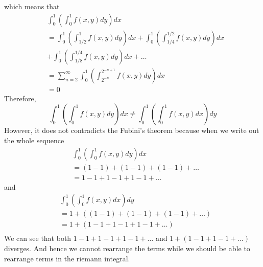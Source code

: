 \documentclass[11pt]{article}
\begin{document}
which means that 
\begin{equation*}
    \begin{align}
        &\int_0^1 \left(\int_0^1 f(x,y) dy \right) dx \\
        &= \int_0^1 \left(\int_{1/2}^1 f(x,y) dy \right) dx + \int_0^1 \left(\int_{1/4}^{1/2} f(x,y) dy \right) dx \\
        &+ \int_0^1 \left(\int_{1/8}^{1/4} f(x,y) dy \right) dx + \ldots \\
        &= \sum_{n=2}^\infty \int_0^1 \left(\int_{2^{-n}}^{2^{-n+1}} f(x,y) dy \right) dx \\
        &= 0 
    \end{align}
\end{equation*}
Therefore, 
\[
    \int_0^1 \left( \int_0^1 f(x,y) dy \right) dx \ne \int_0^1 \left( \int_0^1 f(x,y) dx \right) dy 
\]
However, it does not contradicts the Fubini's theorem because when we write out the whole sequence
\begin{equation*}
    \begin{align}
        &\int_0^1 \left( \int_0^1 f(x,y) dy \right) dx \\
        &= (1-1) + (1-1) + (1-1) + \ldots \\
        &= 1 - 1 + 1 - 1 + 1 -1 + \ldots 
    \end{align}
\end{equation*}
and 
\begin{equation*}
    \begin{align}
        &\int_0^1 \left( \int_0^1 f(x,y) dx \right) dy \\
        &= 1 + \left((1-1) + (1-1) + (1-1) + \ldots \right)\\
        &= 1 + \left(1-1+1-1+1-1+ \ldots \right) \\
    \end{align}
\end{equation*}
We can see that both $1-1 + 1-1 + 1-1 + \ldots$ and $1 + (1-1+1-1+\ldots)$
diverges. And hence we cannot rearrange the terms while we should be able to rearrange terms in the riemann integral.
\end{document}
